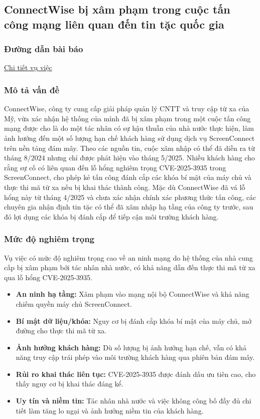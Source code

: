 \subsection{ConnectWise bị xâm phạm trong cuộc tấn công mạng liên quan đến tin tặc quốc gia}

\subsubsection{Đường dẫn bài báo}
\href{https://antoanthongtin.vn/tin/connectwise-bi-xam-pham-trong-cuoc-tan-cong-mang-lien-quan-den-tin-tac-quoc-gia}{Chi tiết vụ việc}

\subsubsection{Mô tả vấn đề}
ConnectWise, công ty cung cấp giải pháp quản lý CNTT và truy cập từ xa của Mỹ, vừa xác nhận hệ thống của mình đã bị xâm phạm trong một cuộc tấn công mạng được cho là do một tác nhân có sự hậu thuẫn của nhà nước thực hiện, làm ảnh hưởng đến một số lượng hạn chế khách hàng sử dụng dịch vụ ScreenConnect trên nền tảng đám mây. Theo các nguồn tin, cuộc xâm nhập có thể đã diễn ra từ tháng 8/2024 nhưng chỉ được phát hiện vào tháng 5/2025. Nhiều khách hàng cho rằng sự cố có liên quan đến lỗ hổng nghiêm trọng CVE-2025-3935 trong ScreenConnect, cho phép kẻ tấn công đánh cắp các khóa bí mật của máy chủ và thực thi mã từ xa nếu bị khai thác thành công. Mặc dù ConnectWise đã vá lỗ hổng này từ tháng 4/2025 và chưa xác nhận chính xác phương thức tấn công, các chuyên gia nhận định tin tặc có thể đã xâm nhập hạ tầng của công ty trước, sau đó lợi dụng các khóa bị đánh cắp để tiếp cận môi trường khách hàng.

\subsubsection{Mức độ nghiêm trọng}
Vụ việc có mức độ nghiêm trọng cao về an ninh mạng do hệ thống của nhà cung cấp bị xâm phạm bởi tác nhân nhà nước, có khả năng dẫn đến thực thi mã từ xa qua lỗ hổng CVE-2025-3935.

\begin{itemize}
    \item \textbf{An ninh hạ tầng:} Xâm phạm vào mạng nội bộ ConnectWise và khả năng chiếm quyền máy chủ ScreenConnect.
    \item \textbf{Bí mật dữ liệu/khóa:} Nguy cơ bị đánh cắp khóa bí mật của máy chủ, mở đường cho thực thi mã từ xa.
    \item \textbf{Ảnh hưởng khách hàng:} Dù số lượng bị ảnh hưởng hạn chế, vẫn có khả năng truy cập trái phép vào môi trường khách hàng qua phiên bản đám mây.
    \item \textbf{Rủi ro khai thác liên tục:} CVE-2025-3935 được đánh dấu ưu tiên cao, cho thấy nguy cơ bị khai thác đáng kể.
    \item \textbf{Uy tín và niềm tin:} Tác nhân nhà nước và việc không công bố đầy đủ chi tiết làm tăng lo ngại và ảnh hưởng niềm tin của khách hàng.
\end{itemize}

